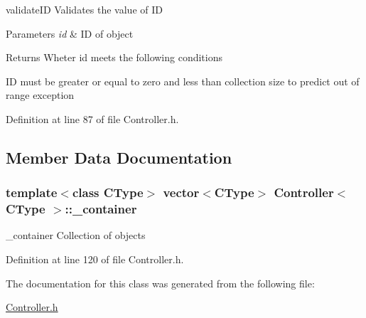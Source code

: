 validate\-I\-D Validates the value of I\-D 


\begin{DoxyParams}{Parameters}
{\em id} & I\-D of object \\
\hline
\end{DoxyParams}
\begin{DoxyReturn}{Returns}
Wheter id meets the following conditions
\end{DoxyReturn}
I\-D must be greater or equal to zero and less than collection size to predict out of range exception 

Definition at line 87 of file Controller.\-h.



\subsection{Member Data Documentation}
\hypertarget{class_controller_a35c624141b5dafd2314829c910db7f9b}{
\subsubsection[{\-\_\-container}]{\setlength{\rightskip}{0pt plus 5cm}template$<$class C\-Type$>$ vector$<$C\-Type$>$ {\bf Controller}$<$ C\-Type $>$\-::\-\_\-container\hspace{0.3cm}{\ttfamily [protected]}}}\label{class_controller_a35c624141b5dafd2314829c910db7f9b}


\-\_\-container Collection of objects 



Definition at line 120 of file Controller.\-h.



The documentation for this class was generated from the following file\-:\begin{DoxyCompactItemize}
\item 
\hyperlink{_controller_8h}{Controller.\-h}\end{DoxyCompactItemize}
